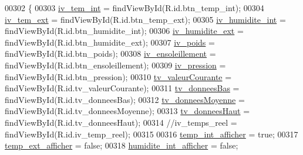 \begin{DoxyCode}
00302     \{
00303         \hyperlink{classfr_1_1campus_1_1laurainc_1_1honeybee_1_1_graph_activity_a87bc6d987048615fed69785ee38e9b86}{iv\_tem\_int} = findViewById(R.id.btn\_temp\_int);
00304         \hyperlink{classfr_1_1campus_1_1laurainc_1_1honeybee_1_1_graph_activity_a3b757042d1dec4fb097bb37f3a06d516}{iv\_tem\_ext} = findViewById(R.id.btn\_temp\_ext);
00305         \hyperlink{classfr_1_1campus_1_1laurainc_1_1honeybee_1_1_graph_activity_a4d73d3543c96bb9b515fa67c8ad786f6}{iv\_humidite\_int} = findViewById(R.id.btn\_humidite\_int);
00306         \hyperlink{classfr_1_1campus_1_1laurainc_1_1honeybee_1_1_graph_activity_ac13880806c185e24ce2818072485141c}{iv\_humidite\_ext} = findViewById(R.id.btn\_humidite\_ext);
00307         \hyperlink{classfr_1_1campus_1_1laurainc_1_1honeybee_1_1_graph_activity_a0508cfebc83dee33b08796d173b0a9d9}{iv\_poids} = findViewById(R.id.btn\_poids);
00308         \hyperlink{classfr_1_1campus_1_1laurainc_1_1honeybee_1_1_graph_activity_a4933271aee8d05223844deaf73ee1802}{iv\_ensoleillement} = findViewById(R.id.btn\_ensoleillement);
00309         \hyperlink{classfr_1_1campus_1_1laurainc_1_1honeybee_1_1_graph_activity_adceab844bbd8bf97865edff454b989de}{iv\_pression} = findViewById(R.id.btn\_pression);
00310         \hyperlink{classfr_1_1campus_1_1laurainc_1_1honeybee_1_1_graph_activity_a32402fa5819cf8f4322c3ae033a3c001}{tv\_valeurCourante} = findViewById(R.id.tv\_valeurCourante);
00311         \hyperlink{classfr_1_1campus_1_1laurainc_1_1honeybee_1_1_graph_activity_a45953a1c53190ccbf5278e9725a2ce43}{tv\_donneesBas} = findViewById(R.id.tv\_donneesBas);
00312         \hyperlink{classfr_1_1campus_1_1laurainc_1_1honeybee_1_1_graph_activity_a13bbba64ced68ea5c90d2761aaa70ac7}{tv\_donneesMoyenne} = findViewById(R.id.tv\_donneesMoyenne);
00313         \hyperlink{classfr_1_1campus_1_1laurainc_1_1honeybee_1_1_graph_activity_afd8484aa261322b9c4df52fcfc69b1ac}{tv\_donneesHaut} = findViewById(R.id.tv\_donneesHaut);
00314         \textcolor{comment}{//iv\_temps\_reel = findViewById(R.id.iv\_temp\_reel);}
00315 
00316         \hyperlink{classfr_1_1campus_1_1laurainc_1_1honeybee_1_1_graph_activity_a42b3b24902493985e648cb0147d93c22}{temp\_int\_afficher} = \textcolor{keyword}{true};
00317         \hyperlink{classfr_1_1campus_1_1laurainc_1_1honeybee_1_1_graph_activity_aec5260a49cf7ae916c0ac7c1ef9a6689}{temp\_ext\_afficher} = \textcolor{keyword}{false};
00318         \hyperlink{classfr_1_1campus_1_1laurainc_1_1honeybee_1_1_graph_activity_a0ffe83f5abece5283d33075072dcd168}{humidite\_int\_afficher} = \textcolor{keyword}{false};

\end{DoxyCode}
